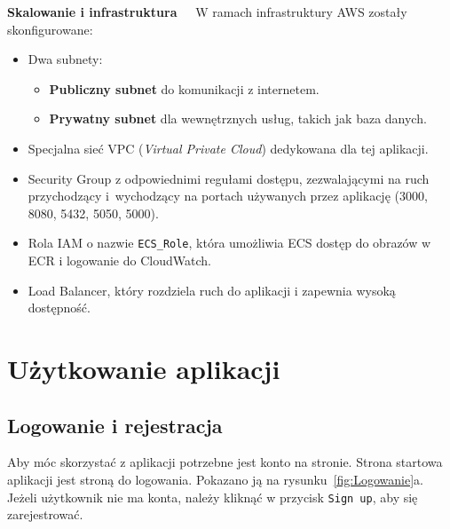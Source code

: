 \textbf{Skalowanie i infrastruktura~~}
W ramach infrastruktury AWS zostały skonfigurowane:
\begin{itemize}
    \item Dwa subnety:
    \begin{itemize}
        \item \textbf{Publiczny subnet} do komunikacji z internetem.
        \item \textbf{Prywatny subnet} dla wewnętrznych usług, takich jak baza danych.
    \end{itemize}
    \item Specjalna sieć VPC (\textit{Virtual Private Cloud}) dedykowana dla tej aplikacji.
    \item Security Group z odpowiednimi regułami dostępu, zezwalającymi na ruch przychodzący i~wychodzący na portach używanych przez aplikację (3000, 8080, 5432, 5050, 5000).
    \item Rola IAM o nazwie \texttt{ECS\_Role}, która umożliwia ECS dostęp do obrazów w ECR i logowanie do CloudWatch.
    \item Load Balancer, który rozdziela ruch do aplikacji i zapewnia wysoką dostępność.
\end{itemize}


\section{Użytkowanie aplikacji}
\subsection{Logowanie i rejestracja}
Aby móc skorzystać z aplikacji potrzebne jest konto na stronie. Strona startowa aplikacji jest stroną do logowania. Pokazano ją na rysunku~\ref{fig:Logowanie}a. Jeżeli użytkownik nie ma konta, należy kliknąć w przycisk \texttt{Sign up}, aby się zarejestrować. 
